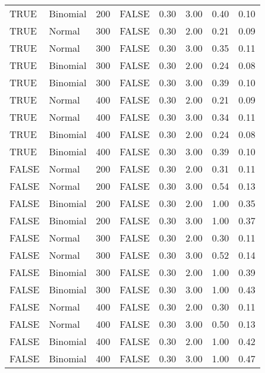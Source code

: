 \begin{longtable}{llrlrrrr}
  TRUE & Binomial & 200 & FALSE & 0.30 & 3.00 & 0.40 & 0.10 \\ 
  TRUE & Normal & 300 & FALSE & 0.30 & 2.00 & 0.21 & 0.09 \\ 
  TRUE & Normal & 300 & FALSE & 0.30 & 3.00 & 0.35 & 0.11 \\ 
  TRUE & Binomial & 300 & FALSE & 0.30 & 2.00 & 0.24 & 0.08 \\ 
  TRUE & Binomial & 300 & FALSE & 0.30 & 3.00 & 0.39 & 0.10 \\ 
  TRUE & Normal & 400 & FALSE & 0.30 & 2.00 & 0.21 & 0.09 \\ 
  TRUE & Normal & 400 & FALSE & 0.30 & 3.00 & 0.34 & 0.11 \\ 
  TRUE & Binomial & 400 & FALSE & 0.30 & 2.00 & 0.24 & 0.08 \\ 
  TRUE & Binomial & 400 & FALSE & 0.30 & 3.00 & 0.39 & 0.10 \\ 
  FALSE & Normal & 200 & FALSE & 0.30 & 2.00 & 0.31 & 0.11 \\ 
  FALSE & Normal & 200 & FALSE & 0.30 & 3.00 & 0.54 & 0.13 \\ 
  FALSE & Binomial & 200 & FALSE & 0.30 & 2.00 & 1.00 & 0.35 \\ 
  FALSE & Binomial & 200 & FALSE & 0.30 & 3.00 & 1.00 & 0.37 \\ 
  FALSE & Normal & 300 & FALSE & 0.30 & 2.00 & 0.30 & 0.11 \\ 
  FALSE & Normal & 300 & FALSE & 0.30 & 3.00 & 0.52 & 0.14 \\ 
  FALSE & Binomial & 300 & FALSE & 0.30 & 2.00 & 1.00 & 0.39 \\ 
  FALSE & Binomial & 300 & FALSE & 0.30 & 3.00 & 1.00 & 0.43 \\ 
  FALSE & Normal & 400 & FALSE & 0.30 & 2.00 & 0.30 & 0.11 \\ 
  FALSE & Normal & 400 & FALSE & 0.30 & 3.00 & 0.50 & 0.13 \\ 
  FALSE & Binomial & 400 & FALSE & 0.30 & 2.00 & 1.00 & 0.42 \\ 
  FALSE & Binomial & 400 & FALSE & 0.30 & 3.00 & 1.00 & 0.47 \\ 
   \hline
\hline
\end{longtable}
